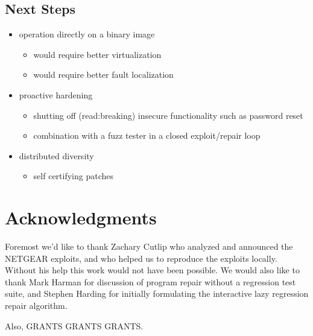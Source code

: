 \documentclass{sigcomm-alternate}
\begin{document}
\subsection{Next Steps}
\label{sec-6-2}
\begin{itemize}
\item operation directly on a binary image
\begin{itemize}
\item would require better virtualization
\item would require better fault localization
\end{itemize}
\item proactive hardening
\begin{itemize}
\item shutting off (read:breaking) insecure functionality such as
password reset
\item combination with a fuzz tester in a closed exploit/repair loop
\end{itemize}
\item distributed diversity
\begin{itemize}
\item self certifying patches
\end{itemize}
\end{itemize}
\section{Acknowledgments}
\label{sec-7}
Foremost we'd like to thank Zachary Cutlip who analyzed and announced
the NETGEAR exploits, and who helped us to reproduce the exploits
locally.  Without his help this work would not have been possible.  We
would also like to thank Mark Harman for discussion of program repair
without a regression test suite, and Stephen Harding for initially
formulating the interactive lazy regression repair algorithm.

Also, GRANTS GRANTS GRANTS.



\end{document}
